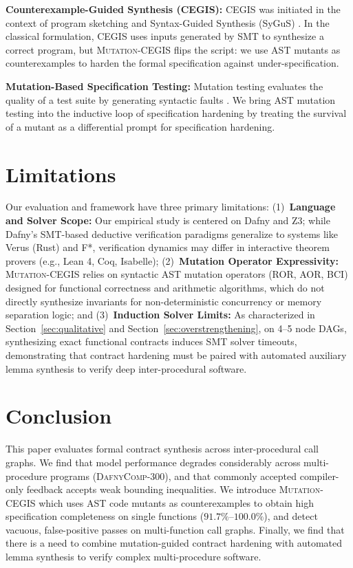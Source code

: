 \documentclass{article}
\begin{document}
\textbf{Counterexample-Guided Synthesis (CEGIS):} CEGIS was initiated in the context of program sketching \citep{solarlezama2006cegis} and Syntax-Guided Synthesis (SyGuS) \citep{alur2013sygus, jha2010oracle, flanagan2001extended}. In the classical formulation, CEGIS uses inputs generated by SMT to synthesize a correct program, but \textsc{Mutation-CEGIS} flips the script: we use AST mutants as counterexamples to harden the formal specification against under-specification.

\textbf{Mutation-Based Specification Testing:} Mutation testing evaluates the quality of a test suite by generating syntactic faults \citep{demillo1978mutation, jia2011analysis, just2014mutants}. We bring AST mutation testing into the inductive loop of specification hardening by treating the survival of a mutant as a differential prompt for specification hardening.

\section{Limitations}
\label{sec:limitations}

Our evaluation and framework have three primary limitations: (1)~\textbf{Language and Solver Scope:} Our empirical study is centered on Dafny and Z3; while Dafny's SMT-based deductive verification paradigms generalize to systems like Verus (Rust) and F*, verification dynamics may differ in interactive theorem provers (e.g., Lean 4, Coq, Isabelle); (2)~\textbf{Mutation Operator Expressivity:} \textsc{Mutation-CEGIS} relies on syntactic AST mutation operators (ROR, AOR, BCI) designed for functional correctness and arithmetic algorithms, which do not directly synthesize invariants for non-deterministic concurrency or memory separation logic; and (3)~\textbf{Induction Solver Limits:} As characterized in Section~\ref{sec:qualitative} and Section~\ref{sec:overstrengthening}, on 4--5 node DAGs, synthesizing exact functional contracts induces SMT solver timeouts, demonstrating that contract hardening must be paired with automated auxiliary lemma synthesis to verify deep inter-procedural software.

\section{Conclusion}
\label{sec:conclusion}

This paper evaluates formal contract synthesis across inter-procedural call graphs. We find that model performance degrades considerably across multi-procedure programs (\textsc{DafnyComp-300}), and that commonly accepted compiler-only feedback accepts weak bounding inequalities. We introduce \textsc{Mutation-CEGIS} which uses AST code mutants as counterexamples to obtain high specification completeness on single functions ($91.7\%\text{--}100.0\%$), and detect vacuous, false-positive passes on multi-function call graphs. Finally, we find that there is a need to combine mutation-guided contract hardening with automated lemma synthesis to verify complex multi-procedure software.
\end{document}
